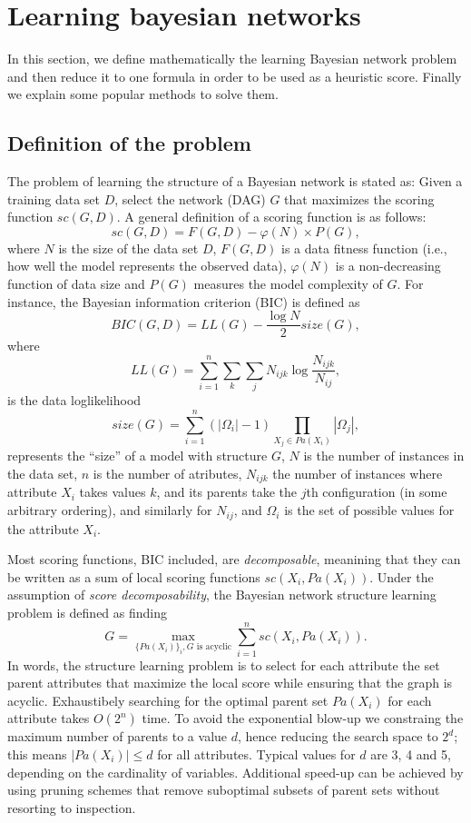 \section{Learning bayesian networks}
\label{sec:learning}

In this section, we define mathematically the learning Bayesian network problem and then reduce it to one formula in order to be used as a heuristic score. Finally we explain some popular methods to solve them.

\subsection{Definition of the problem}
\label{subsec:definition}

The problem of learning the structure of a Bayesian network is stated as: Given a training data set $D $, select the network (DAG) $G$ that maximizes the scoring function ${sc}( G , D )$.
A general definition of a scoring function is as follows:
	\[ {sc}( G , D ) = F( G, D ) - \varphi( N ) \times P( G ) ,\]
where $N$ is the size of the data set $D$, $F( G, D )$ is a data fitness function (i.e., how well the model represents the observed data), $\varphi( N )$ is a non-decreasing function of data size and $P( G )$ measures the model complexity of $G$. For instance,  the Bayesian information criterion (BIC) is defined as
	\[ {BIC}( G , D ) = {LL}( G ) - \frac{\log N}{2} {size}( G ) ,\]
where
	\[ {LL}( G ) = \sum_{i=1}^{n} \sum_{k} \sum_{j} N_{ijk} \log \frac{N_{ijk}}{N_{ij}} ,\] is the data loglikelihood
	\[ {size}( G ) = \sum_{i=1}^{n} ( |\Omega_i| - 1 ) \prod_{X_j \in {Pa}( X_i )} |\Omega_j| ,\] represents the ``size'' of a model with structure $G$, 
$N$ is the number of instances in the data set, $n$ is the number of atributes, $N_{ijk}$ the number of instances where attribute $X_i$ takes values $k$, and its parents take the $j$th configuration (in some arbitrary ordering), and similarly  for $N_{ij}$, and $\Omega_i$ is the set of possible values for the attribute $X_i$.

        Most scoring functions, BIC included, are \emph{decomposable}, meanining that they can be written as a sum of local scoring functions $sc(X_i, {Pa}(X_i))$. Under the assumption of \emph{score decomposability}, the Bayesian network structure learning problem is defined as finding
	\[ G = \max_{\{ {Pa}(X_i)\}_i, G \text{ is acyclic}} \sum_{i=1}^n {sc}( X_i , {Pa}( X_i ) ) . \]
In words, the structure learning problem is to select for each attribute the set parent attributes that maximize the local score while ensuring that the graph is acyclic. Exhaustibely searching for the optimal parent set ${Pa}( X_i)$ for each attribute takes $O(2^n)$ time. To avoid the exponential blow-up we constraing the maximum number of parents to a value $d$, hence reducing the search space to $2^d$; this means $|{Pa}( X_i )| \leq d$ for all attributes. Typical values for $d$ are 3, 4 and 5, depending on the cardinality of variables. Additional speed-up can be achieved by using pruning schemes that remove suboptimal subsets of parent sets without resorting to inspection.

